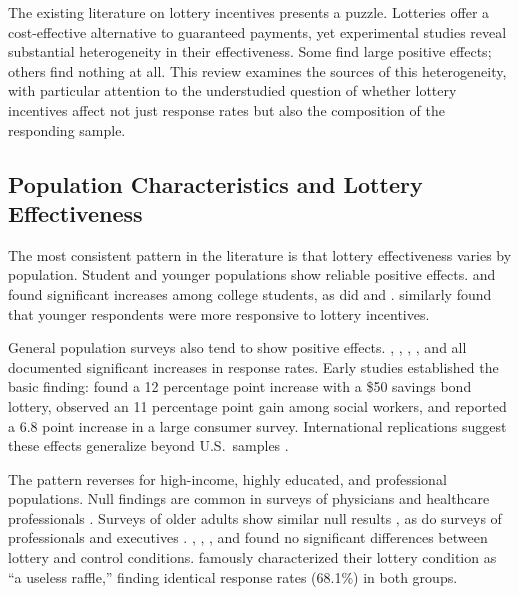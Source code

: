 The existing literature on lottery incentives presents a puzzle. Lotteries offer a
cost-effective alternative to guaranteed payments, yet experimental studies reveal
substantial heterogeneity in their effectiveness. Some find large positive effects;
others find nothing at all. This review examines the sources of this heterogeneity, with
particular attention to the understudied question of whether lottery incentives affect not
just response rates but also the composition of the responding sample.

\subsection{Population Characteristics and Lottery Effectiveness}

The most consistent pattern in the literature is that lottery effectiveness varies by
population. Student and younger populations show reliable positive effects.
\textcite{Laguilles.etal2011a} and \textcite{LaRose.Tsai2014a} found significant increases among
college students, as did \textcite{Sanchez-Fernandez.etal2010a} and \textcite{Porter.Whitcomb2003}.
\textcite{Martinson.etal2000} similarly found that younger respondents were more responsive to
lottery incentives.

General population surveys also tend to show positive effects. \textcite{Olsen.etal2012},
\textcite{Johansson.etal1997}, \textcite{Pedersen.Nielsen2016a}, \textcite{Woodward.etal1985}, and
\textcite{Marrett.etal1992} all documented significant increases in response rates. Early
studies established the basic finding: \textcite{Mccool1991} found a 12 percentage point
increase with a \$50 savings bond lottery, \textcite{Blythe1986} observed an 11
percentage point gain among social workers, and \textcite{Balakrishnan.etal1992} reported a
6.8 point increase in a large consumer survey. International replications suggest these
effects generalize beyond U.S.\ samples \parencite{Angur.Nataraajan1995, Johansson.etal1997, Conn.etal2025a}.

The pattern reverses for high-income, highly educated, and professional populations. Null
findings are common in surveys of physicians and healthcare professionals
\parencite{Moses.Clark2004, Cottrell.etal2015, Grava-Gubins.Scott2008, Halpern.etal2011a, Ulrich.etal2005,
Dykema.etal2011a, Gallagher.etal2001, Mclaren.Shelley2000, So.etal2018a}. Surveys of older adults show similar
null results \parencite{Finsen.Storeheier2006, Gjostein.etal2016, Roberts.etal2000a}, as do surveys of
professionals and executives \parencite{Lorenzi.etal1988, Coryn.etal2020, Golden.etal1981}.
\textcite{Warriner.etal1996}, \textcite{Harris.etal2008}, \textcite{Lipps2010}, and
\textcite{Brennan.etal1993a} found no significant differences between lottery and control
conditions. \textcite{Mortagy.etal1985} famously characterized their lottery condition as ``a
useless raffle,'' finding identical response rates (68.1\%) in both groups.

